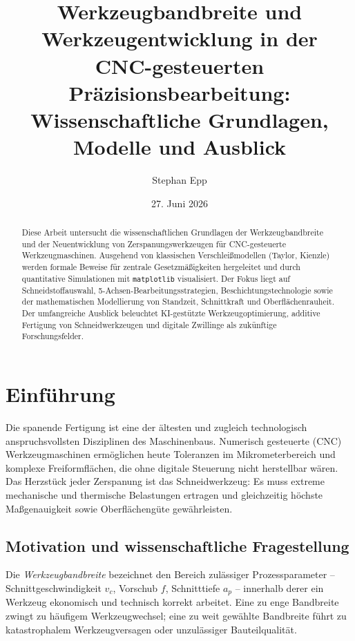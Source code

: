 ﻿\documentclass[a4paper,12pt]{article}
\title{Werkzeugbandbreite und Werkzeugentwicklung in der\\
CNC-gesteuerten Präzisionsbearbeitung:\\
Wissenschaftliche Grundlagen, Modelle und Ausblick}
\author{Stephan Epp}
\date{27. Juni 2026}
\theoremstyle{definition}
\begin{document}
\maketitle

\begin{abstract}
Diese Arbeit untersucht die wissenschaftlichen Grundlagen der Werkzeugbandbreite
und der Neuentwicklung von Zerspanungswerkzeugen für CNC-gesteuerte Werkzeugmaschinen.
Ausgehend von klassischen Verschleißmodellen (Taylor, Kienzle) werden formale
Beweise für zentrale Gesetzmäßigkeiten hergeleitet und durch quantitative Simulationen
mit \texttt{matplotlib} visualisiert. Der Fokus liegt auf Schneidstoffauswahl,
5-Achsen-Bearbeitungsstrategien, Beschichtungstechnologie sowie der mathematischen
Modellierung von Standzeit, Schnittkraft und Oberflächenrauheit. Der umfangreiche
Ausblick beleuchtet KI-gestützte Werkzeugoptimierung, additive Fertigung von
Schneidwerkzeugen und digitale Zwillinge als zukünftige Forschungsfelder.
\end{abstract}

\tableofcontents
\newpage

\section{Einführung}

Die spanende Fertigung ist eine der ältesten und zugleich technologisch
anspruchsvollsten Disziplinen des Maschinenbaus. Numerisch gesteuerte (CNC)
Werkzeugmaschinen ermöglichen heute Toleranzen im Mikrometerbereich und
komplexe Freiformflächen, die ohne digitale Steuerung nicht herstellbar wären.
Das Herzstück jeder Zerspanung ist das Schneidwerkzeug: Es muss extreme
mechanische und thermische Belastungen ertragen und gleichzeitig höchste
Maßgenauigkeit sowie Oberflächengüte gewährleisten.

\subsection{Motivation und wissenschaftliche Fragestellung}

Die \emph{Werkzeugbandbreite} bezeichnet den Bereich zulässiger Prozessparameter
-- Schnittgeschwindigkeit $v_c$, Vorschub $f$, Schnitttiefe $a_p$ -- innerhalb
derer ein Werkzeug ekonomisch und technisch korrekt arbeitet. Eine zu enge
Bandbreite zwingt zu häufigem Werkzeugwechsel; eine zu weit gewählte Bandbreite
führt zu katastrophalem Werkzeugversagen oder unzulässiger Bauteilqualität.
\end{document}
